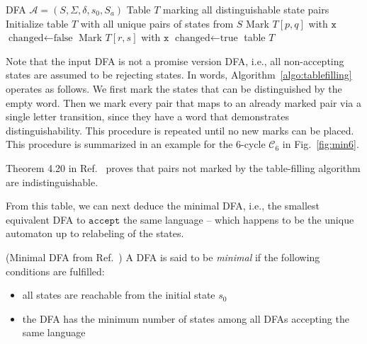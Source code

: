 \documentclass[../main.tex]{subfiles}
\begin{document}
\begin{algorithm}[H]

\caption{Table-filling~(adopted from~\cite{hopcroft2001introduction})}\label{algo:tablefilling}
    \begin{algorithmic}[1]
    
\REQUIRE DFA $\mathcal{A} = (S, \Sigma, \delta, s_0, S_a)$
\ENSURE Table $T$ marking all distinguishable state pairs
\STATE Initialize table $T$ with all unique pairs of states from $S$
        \STATE Mark $T[p,q]$ with $\mathtt{x}$
    \ENDIF
\ENDFOR
\REPEAT
    \STATE $\text{changed} \leftarrow \text{false}$
                    \STATE Mark $T[r,s]$ with $\mathtt{x}$
                    \STATE $\text{changed} \leftarrow \text{true}$
                \ENDIF
            \ENDFOR
        \ENDFOR
    \ENDFOR
{}
\STATE \RETURN table $T$

    \end{algorithmic}
\end{algorithm}


Note that the input \ac{DFA} is not a promise version \ac{DFA}, i.e., all non-accepting states are assumed to be rejecting states. In words, Algorithm~\ref{algo:tablefilling} operates as follows. We first mark the states that can be distinguished by the empty word. Then we mark every pair that maps to an already marked pair via a single letter transition, since they have a word that demonstrates distinguishability. This procedure is repeated until no new marks can be placed. This procedure is summarized in an example for the 6-cycle $\mathcal{C}_6$ in Fig.~\ref{fig:min6}.

Theorem 4.20 in Ref.~\cite{hopcroft2001introduction} proves that pairs not marked by the table-filling algorithm are indistinguishable.


From this table, we can next deduce the minimal \ac{DFA}, i.e., the smallest equivalent \ac{DFA} to $\mathtt{accept}$ the same language -- which happens to be the unique automaton up to relabeling of the states. 

\begin{definition} (Minimal DFA from Ref.~\cite{hopcroft2001introduction})
 A DFA is said to be \textit{minimal} if the following conditions are fulfilled:
\begin{itemize}
    \item all states are reachable from the initial state $s_0$
    \item the DFA has the minimum number of states among all DFAs accepting the same language
\end{itemize}
\end{definition}
\end{document}
